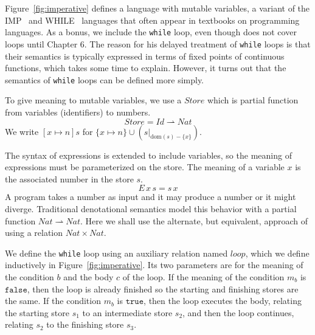 \documentclass{tufte-handout}
\newcommand{\TRUE}[0]{\mathtt{true}}
\newcommand{\FALSE}[0]{\mathtt{false}}
\newcommand{\pto}[0]{\rightharpoonup}
\begin{document}

Figure~\ref{fig:imperative} defines a language with mutable variables,
a variant of the
IMP~\citep{Plotkin:1983aa,Winskel:1993uq,Amadio:1998fk} and
WHILE~\citep{Hoare:1969kw} languages that often appear in textbooks on
programming languages. As a bonus, we include the \texttt{while} loop,
even though \citet{Schmidt:1986vn} does not cover loops until Chapter
6. The reason for his delayed treatment of \texttt{while} loops is
that their semantics is typically expressed in terms of fixed points
of continuous functions, which takes some time to explain. However, it
turns out that the semantics of \texttt{while} loops can be defined
more simply.

To give meaning to mutable variables, we use a $\mathit{Store}$ which
is partial function from variables (identifiers) to numbers.
\[
  \mathit{Store} = \mathit{Id} \pto \mathit{Nat}
\]
We write $[x\mapsto n]s$ for $\{x\mapsto n\} \cup
(s|_{\mathrm{dom}(s)-\{x\}})$.

The syntax of expressions is extended to include variables, so the
meaning of expressions must be parameterized on the store. The meaning
of a variable $x$ is the associated number in the store $s$.
\[
  E\,x\,s = s\,x
\]
%
A program takes a number as input and it may produce a number or it
might diverge. Traditional denotational semantics model this behavior
with a partial function
$\mathit{Nat}\pto\mathit{Nat}$. Here we shall use the
alternate, but equivalent, approach of using a relation
$\mathit{Nat}\times\mathit{Nat}$.

We define the \texttt{while} loop using an auxiliary relation named
$\mathit{loop}$, which we define inductively in
Figure~\ref{fig:imperative}. Its two parameters are for the meaning of
the condition $b$ and the body $c$ of the loop.  If the meaning of the
condition $m_b$ is $\FALSE$, then the loop is already finished so the
starting and finishing stores are the same. If the condition $m_b$ is
$\TRUE$, then the loop executes the body, relating the starting store
$s_1$ to an intermediate store $s_2$, and then the loop continues,
relating $s_2$ to the finishing store $s_3$.

\end{document}

